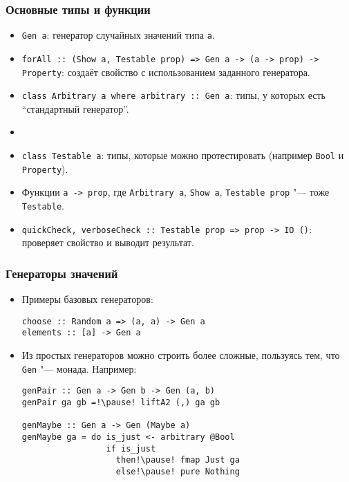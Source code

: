 \documentclass[11pt]{beamer}
\begin{document}
\begin{frame}[fragile]
  \frametitle{Основные типы и функции}
  \begin{itemize}
    \item \lstinline|Gen a|: генератор случайных значений типа \lstinline|a|.
    \item \lstinline|forAll :: (Show a, Testable prop) => Gen a -> (a -> prop) -> Property|: создаёт свойство с использованием заданного генератора.
    \item \lstinline|class Arbitrary a where arbitrary :: Gen a|: типы, у которых есть \enquote{стандартный генератор}.
    \item[]
    \item \lstinline|class Testable a|: типы, которые можно протестировать (например \lstinline|Bool| и \lstinline|Property|).
    \item Функции \lstinline|a -> prop|, где \lstinline|Arbitrary a|, \lstinline|Show a|, \lstinline|Testable prop| "--- тоже \lstinline|Testable|.
    \item \lstinline|quickCheck, verboseCheck :: Testable prop => prop -> IO ()|: проверяет свойство и выводит результат.
  \end{itemize}
\end{frame}

\begin{frame}[fragile]
  \frametitle{Генераторы значений}
  \begin{itemize}
    \item Примеры базовых генераторов:
          \begin{lstlisting}[basicstyle=\ttfamily\small]
choose :: Random a => (a, a) -> Gen a
elements :: [a] -> Gen a
\end{lstlisting}
    \item Из простых генераторов можно строить более сложные, пользуясь тем, что \lstinline|Gen| "--- монада. Например:
          \begin{lstlisting}[basicstyle=\ttfamily\small]
genPair :: Gen a -> Gen b -> Gen (a, b)
genPair ga gb =!\pause! liftA2 (,) ga gb

genMaybe :: Gen a -> Gen (Maybe a)
genMaybe ga = do is_just <- arbitrary @Bool
                 if is_just 
                   then!\pause! fmap Just ga
                   else!\pause! pure Nothing
\end{lstlisting}
  \end{itemize}
\end{frame}
\end{document}
